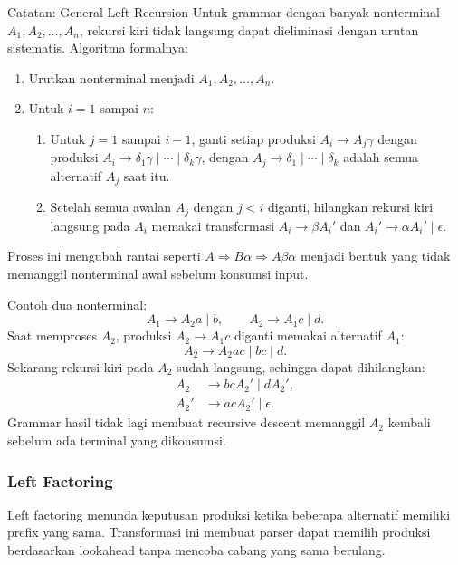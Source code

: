 \begin{cmt}{Catatan: General Left Recursion}{}
Untuk grammar dengan banyak nonterminal $A_1,A_2,\ldots,A_n$, rekursi kiri tidak langsung dapat dieliminasi dengan urutan sistematis. Algoritma formalnya:
\begin{enumerate}
    \item Urutkan nonterminal menjadi $A_1,A_2,\ldots,A_n$.
    \item Untuk $i=1$ sampai $n$:
    \begin{enumerate}
        \item Untuk $j=1$ sampai $i-1$, ganti setiap produksi $A_i\rightarrow A_j\gamma$ dengan produksi $A_i\rightarrow \delta_1\gamma\mid\cdots\mid\delta_k\gamma$, dengan $A_j\rightarrow\delta_1\mid\cdots\mid\delta_k$ adalah semua alternatif $A_j$ saat itu.
        \item Setelah semua awalan $A_j$ dengan $j<i$ diganti, hilangkan rekursi kiri langsung pada $A_i$ memakai transformasi $A_i\rightarrow\beta A_i'$ dan $A_i'\rightarrow\alpha A_i'\mid\epsilon$.
    \end{enumerate}
\end{enumerate}
Proses ini mengubah rantai seperti $A\Rightarrow B\alpha\Rightarrow A\beta\alpha$ menjadi bentuk yang tidak memanggil nonterminal awal sebelum konsumsi input.

Contoh dua nonterminal:
\[
    A_1\rightarrow A_2a\mid b,\qquad A_2\rightarrow A_1c\mid d.
\]
Saat memproses $A_2$, produksi $A_2\rightarrow A_1c$ diganti memakai alternatif $A_1$:
\[
    A_2\rightarrow A_2ac\mid bc\mid d.
\]
Sekarang rekursi kiri pada $A_2$ sudah langsung, sehingga dapat dihilangkan:
\[
\begin{aligned}
    A_2 &\rightarrow bcA_2'\mid dA_2',\\
    A_2' &\rightarrow acA_2'\mid\epsilon.
\end{aligned}
\]
Grammar hasil tidak lagi membuat recursive descent memanggil $A_2$ kembali sebelum ada terminal yang dikonsumsi.
\end{cmt}

\subsubsection{Left Factoring}

\begin{jawab}
Left factoring menunda keputusan produksi ketika beberapa alternatif memiliki prefix yang sama. Transformasi ini membuat parser dapat memilih produksi berdasarkan lookahead tanpa mencoba cabang yang sama berulang.
\end{jawab}

